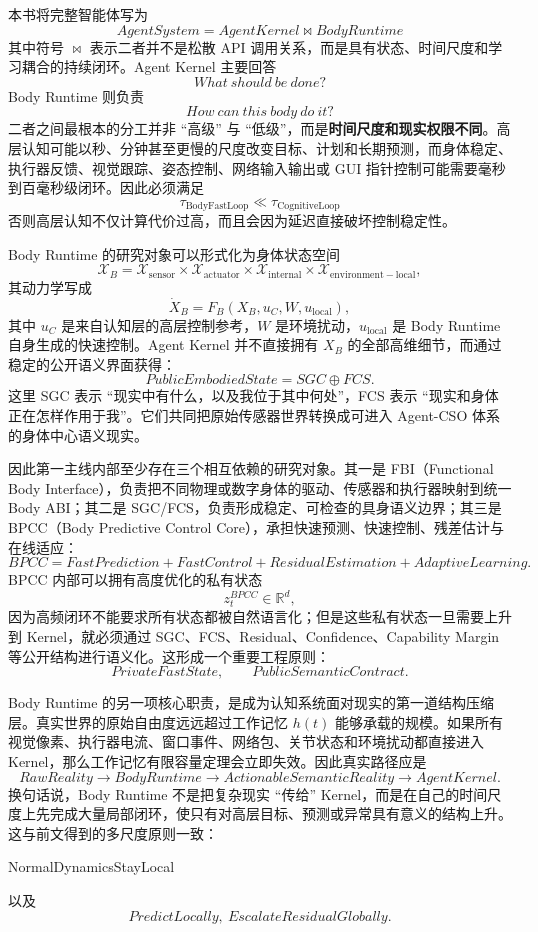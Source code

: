 本书将完整智能体写为
\[
\boxed{
AgentSystem = AgentKernel \bowtie BodyRuntime
}
\]
其中符号 $\bowtie$ 表示二者并不是松散 API 调用关系，而是具有状态、时间尺度和学习耦合的持续闭环。Agent Kernel 主要回答
\[
What\ should\ be\ done?
\]
Body Runtime 则负责
\[
How\ can\ this\ body\ do\ it?
\]
二者之间最根本的分工并非 ``高级'' 与 ``低级''，而是\textbf{时间尺度和现实权限不同}。高层认知可能以秒、分钟甚至更慢的尺度改变目标、计划和长期预测，而身体稳定、执行器反馈、视觉跟踪、姿态控制、网络输入输出或 GUI 指针控制可能需要毫秒到百毫秒级闭环。因此必须满足
\[
\boxed{
\tau_{\mathrm{BodyFastLoop}}
\ll
\tau_{\mathrm{CognitiveLoop}}
}
\]
否则高层认知不仅计算代价过高，而且会因为延迟直接破坏控制稳定性。

Body Runtime 的研究对象可以形式化为身体状态空间
\[
\mathcal X_B
=
\mathcal X_{\mathrm{sensor}}
\times
\mathcal X_{\mathrm{actuator}}
\times
\mathcal X_{\mathrm{internal}}
\times
\mathcal X_{\mathrm{environment-local}},
\]
其动力学写成
\[
\dot X_B
=
F_B
\left(
X_B,
u_C,
W,
u_{\mathrm{local}}
\right),
\]
其中 $u_C$ 是来自认知层的高层控制参考，$W$ 是环境扰动，$u_{\mathrm{local}}$ 是 Body Runtime 自身生成的快速控制。Agent Kernel 并不直接拥有 $X_B$ 的全部高维细节，而通过稳定的公开语义界面获得：
\[
\boxed{
PublicEmbodiedState = SGC \oplus FCS .
}
\]
这里 SGC 表示 ``现实中有什么，以及我位于其中何处''，FCS 表示 ``现实和身体正在怎样作用于我''。它们共同把原始传感器世界转换成可进入 Agent-CSO 体系的身体中心语义现实。

因此第一主线内部至少存在三个相互依赖的研究对象。其一是 FBI（Functional Body Interface），负责把不同物理或数字身体的驱动、传感器和执行器映射到统一 Body ABI；其二是 SGC/FCS，负责形成稳定、可检查的具身语义边界；其三是 BPCC（Body Predictive Control Core），承担快速预测、快速控制、残差估计与在线适应：
\[
\boxed{
BPCC
=
FastPrediction
+
FastControl
+
ResidualEstimation
+
AdaptiveLearning .
}
\]
BPCC 内部可以拥有高度优化的私有状态
\[
z_t^{BPCC}\in\mathbb R^d,
\]
因为高频闭环不能要求所有状态都被自然语言化；但是这些私有状态一旦需要上升到 Kernel，就必须通过 SGC、FCS、Residual、Confidence、Capability Margin 等公开结构进行语义化。这形成一个重要工程原则：
\[
\boxed{
PrivateFastState,\qquad PublicSemanticContract.
}
\]

Body Runtime 的另一项核心职责，是成为认知系统面对现实的第一道结构压缩层。真实世界的原始自由度远远超过工作记忆 $h(t)$ 能够承载的规模。如果所有视觉像素、执行器电流、窗口事件、网络包、关节状态和环境扰动都直接进入 Kernel，那么工作记忆有限容量定理会立即失效。因此真实路径应是
\[
RawReality
\rightarrow
BodyRuntime
\rightarrow
ActionableSemanticReality
\rightarrow
AgentKernel.
\]
换句话说，Body Runtime 不是把复杂现实 ``传给'' Kernel，而是在自己的时间尺度上先完成大量局部闭环，使只有对高层目标、预测或异常具有意义的结构上升。这与前文得到的多尺度原则一致：
\begin{statementbox}
NormalDynamicsStayLocal
\end{statementbox}
以及
\[
\boxed{
PredictLocally,\ EscalateResidualGlobally.
}
\]

